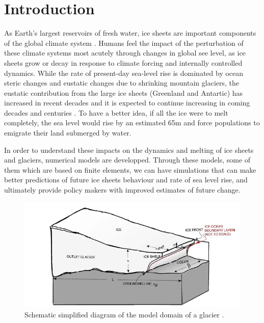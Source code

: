 \documentclass[a4paper,12pt]{article}
\begin{document}
\tableofcontents

\newpage
\begin{abstract}
	\justifying
	\begin{equation}
		E=mc^2;
	\end{equation}
\end{abstract}
\pagebreak

\section{Introduction}
\justifying
As Earth's largest reservoirs of fresh water, ice sheets are important components of the global climate system \cite[]{zhang2017comparison}. Humans feel the impact of the perturbation of these climate systems most acutely through changes in global see level, as ice sheets grow or decay in response to climate forcing and internally controlled dynamics. While the rate of present-day sea-level rise is dominated by ocean steric changes and eustatic changes due to shrinking mountain glaciers, the eustatic contribution from the large ice sheets (Greenland and Antartic) has increased in recent decades and it is expected to continue increasing in coming decades and centuries \cite[]{clark2015recent}. To have a better idea, if all the ice were to melt completely, the sea level would rise by an estimated 65m \cite[]{morlighem2017bedmachine,haywood2011pliocene} and force populations to emigrate their land submerged by water.

In order to understand these impacts on the dynamics and melting of ice sheets and glaciers, numerical models are developped. Through these models, some of them which are based on finite elements, we can have simulations that can make better predictions of future ice sheets behaviour and rate of sea level rise, and ultimately provide policy makers with improved estimates of future change.

\begin{figure}[!h]
	\centering
	\includegraphics[width=0.7\linewidth]{../fig/Scheme_grounding_line}
	\caption{Schematic simplified diagram of the model domain of a glacier \cite[]{parizek2010implications}.}
	\label{groundingline}
\end{figure}
\end{document}
